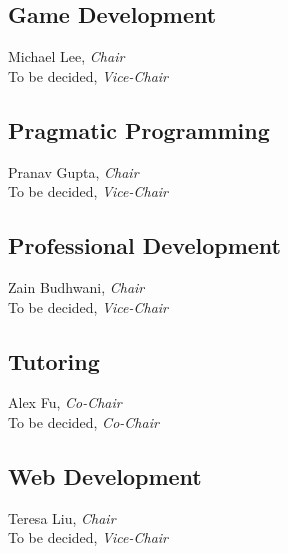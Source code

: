 \documentclass[10pt]{article}
\newcommand{\chair}[1]{#1, \textit{Chair}}
\newcommand{\vicechair}[1]{#1, \textit{Vice-Chair}}
\newcommand{\cochair}[1]{#1, \textit{Co-Chair}}
\begin{document}
\subsection{Game Development}

\chair{Michael Lee}\\
\vicechair{To be decided}

\subsection{Pragmatic Programming}

\chair{Pranav Gupta}\\
\vicechair{To be decided}

\subsection{Professional Development}

\chair{Zain Budhwani}\\
\vicechair{To be decided}

\subsection{Tutoring}

\cochair{Alex Fu}\\
\cochair{To be decided}

\subsection{Web Development}

\chair{Teresa Liu}\\
\vicechair{To be decided}
\end{document}
